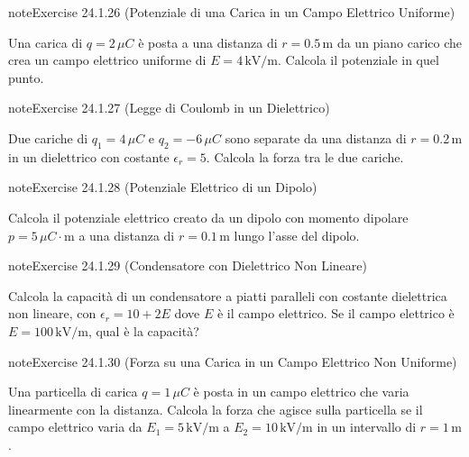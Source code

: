 \documentclass[letterpaper,10pt,italian]{jupyterBook}
\begin{document}
\begin{sphinxadmonition}{note}{Exercise 24.1.26 (Potenziale di una Carica in un Campo Elettrico Uniforme)}



\sphinxAtStartPar
Una carica di \(q = 2 \, \mu C\) è posta a una distanza di \(r = 0.5 \, \text{m}\) da un piano carico che crea un campo elettrico uniforme di \(E = 4 \, \text{kV/m}\). Calcola il potenziale in quel punto.
\end{sphinxadmonition}
 \label{exercise:ch/electromagnetism/electrostatics-problems-exercise-26}

\begin{sphinxadmonition}{note}{Exercise 24.1.27 (Legge di Coulomb in un Dielettrico)}



\sphinxAtStartPar
Due cariche di \(q_1 = 4 \, \mu C\) e \(q_2 = -6 \, \mu C\) sono separate da una distanza di \(r = 0.2 \, \text{m}\) in un dielettrico con costante \(\epsilon_r = 5\). Calcola la forza tra le due cariche.
\end{sphinxadmonition}
 \label{exercise:ch/electromagnetism/electrostatics-problems-exercise-27}

\begin{sphinxadmonition}{note}{Exercise 24.1.28 (Potenziale Elettrico di un Dipolo)}



\sphinxAtStartPar
Calcola il potenziale elettrico creato da un dipolo con momento dipolare \(p = 5 \, \mu C \cdot \text{m}\) a una distanza di \(r = 0.1 \, \text{m}\) lungo l’asse del dipolo.
\end{sphinxadmonition}
 \label{exercise:ch/electromagnetism/electrostatics-problems-exercise-28}

\begin{sphinxadmonition}{note}{Exercise 24.1.29 (Condensatore con Dielettrico Non Lineare)}



\sphinxAtStartPar
Calcola la capacità di un condensatore a piatti paralleli con costante dielettrica non lineare, con \(\epsilon_r = 10 + 2E\) dove \(E\) è il campo elettrico. Se il campo elettrico è \(E = 100 \, \text{kV/m}\), qual è la capacità?
\end{sphinxadmonition}
 \label{exercise:ch/electromagnetism/electrostatics-problems-exercise-29}

\begin{sphinxadmonition}{note}{Exercise 24.1.30 (Forza su una Carica in un Campo Elettrico Non Uniforme)}



\sphinxAtStartPar
Una particella di carica \(q = 1 \, \mu C\) è posta in un campo elettrico che varia linearmente con la distanza. Calcola la forza che agisce sulla particella se il campo elettrico varia da \(E_1 = 5 \, \text{kV/m}\) a \(E_2 = 10 \, \text{kV/m}\) in un intervallo di \(r = 1 \, \text{m}\).
\end{sphinxadmonition}
 \label{exercise:ch/electromagnetism/electrostatics-problems-exercise-30}
\end{document}
